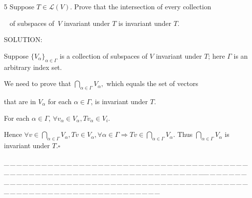 \documentclass[a4paper, 11pt, UTF8]{article}
\def\Lm{\mathcal{L}}
\begin{document}
\begin{large}
{\timesbf\Large 5} {\timessl\Large 
Suppose $T\in\Lm(V)$. Prove that the intersection of every collection}\par\,\,\,
{\timessl\Large of subspaces of \,$V$ invariant under $T$ is invariant under $T$.
}\par
{\timesbf S\footnotesize{OLUTION:}}\par\quad
Suppose $\{V_\alpha\}_{\alpha\in\Gamma}$ is a collection of subspaces of $V$ invariant under $T$; here $\Gamma$ is an arbitrary index set.\par\quad
We need to prove that $\bigcap_{\alpha\in\Gamma}V_\alpha,$ which equals the set of vectors\par\qquad\qquad\qquad\qquad that are in $V_\alpha$ for each $\alpha\in\Gamma$, is invariant under $T$.\par\quad
For each $\alpha\in\Gamma$, $\forall v_\alpha\in V_\alpha,Tv_\alpha\in V_i.$\par\quad
Hence $\forall v\in \bigcap_{\alpha\in\Gamma}V_\alpha,Tv\in V_\alpha,\forall\alpha\in\Gamma\Rightarrow Tv\in\bigcap_{\alpha\in\Gamma}V_\alpha.$
Thus $\bigcap_{\alpha\in\Gamma}V_\alpha$ is invariant under $T$.\quad$\square$\par
{\tiny \_\,\_\,\_\,\_\,\_\,\_\,\_\,\_\,\_\,\_\,\_\,\_\,\_\,\_\,\_\,\_\,\_\,\_\,\_\,\_\,\_\,\_\,\_\,\_\,\_\,\_\,\_\,\_\,\_\,\_\,\_\,\_\,\_\,\_\,\_\,\_\,\_\,\_\,\_\,\_\,\_\,\_\,\_\,\_\,\_\,\_\,\_\,\_\,\_\,\_\,\_\,\_\,\_\,\_\,\_\,\_\,\_\,\_\,\_\,\_\,\_\,\_\,\_\,\_\,\_\,\_\,\_\,\_\,\_\,\_\,\_\_\,\_\,\_\,\_\,\_\,\_\,\_\,\_\,\_\,\_\,\_\,\_\,\_\,\_\,\_\,\_\,\_\,\_\,\_\,\_\,\_\,\_\,\_\,\_\,\_\,\_\,\_\,\_\,\_\,\_\,\_\,\_\,\_\,\_\,\_\,\_\,\_\,\_\,\_\,\_\,\_\,\_\,\_\,\_\,\_\,\_\,\_\,\_\,\_\,\_\,\_\,\_\,\_\,\_\,\_\,\_\,\_\,\_\,\_\,\_\,\_\,\_\,\_\,\_\,\_\,\_\,\_\,\_\,\_\,\_\,\_}\par


\end{large}
\end{document}
